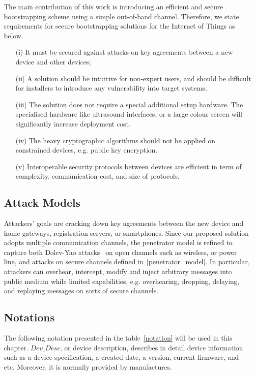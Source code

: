The main contribution of this work is introducing an efficient and secure bootstrapping scheme using a simple out-of-band channel. Therefore, we state requirements for secure bootstrapping solutions for the Internet of Things as below.
\begin{enumerate}
\item [(i)] It must be secured against attacks on key agreements between a new device and other devices;
\item [(ii)] A solution should be intuitive for non-expert users, and should be difficult for installers to introduce any vulnerability into target systems; 
\item [(iii)] The solution does not require a special additional setup hardware. The specialised hardware like ultrasound interfaces, or a large colour screen will significantly increase deployment cost. 
\item[(iv)] The heavy cryptographic algorithms should not be applied on constrained devices, e.g. public key encryption. 
\item[(v)] Interoperable security protocols between devices are efficient in term of complexity, communication cost, and size of protocols.  
\end{enumerate} 

\subsection{Attack Models}

Attackers' goals are cracking down key agreements between the new device and home gateways, registration servers, or smartphones. Since our proposed solution adopts multiple communication channels, the penetrator model is refined to capture both Dolev-Yao attacks~\cite{dolev-yao} on open channels such as wireless, or power line, and attacks on secure channels defined in~\ref{penetrator_model}. In particular, attackers can overhear, intercept, modify and inject arbitrary messages into public medium while limited capabilities, e.g. overhearing, dropping, delaying, and replaying messages on sorts of secure channels. 

\subsection{Notations}

The following notation presented in the table~\ref{notation} will be used in this chapter. $Dev\_Desc$, or device description, describes in detail device information such as a device specification, a created date, a version, current firmware, and etc. Moreover, it is normally provided by manufactures. 

